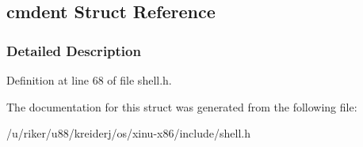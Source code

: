 \hypertarget{structcmdent}{}\subsection{cmdent Struct Reference}
\label{structcmdent}


\subsubsection{Detailed Description}


Definition at line 68 of file shell.\+h.



The documentation for this struct was generated from the following file\+:\begin{DoxyCompactItemize}
\item 
/u/riker/u88/kreiderj/os/xinu-\/x86/include/shell.\+h\end{DoxyCompactItemize}
